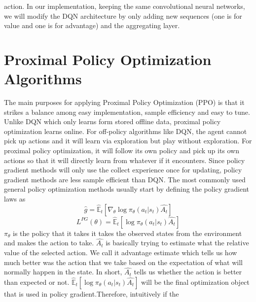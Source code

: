 \documentclass[%
,aps%
 ,twocolumn%
 ,secnumarabic%
,amssymb, amsmath,nobibnotes, aps, prl, floatfix]{revtex4-1}
\begin{document}
action. In our implementation, keeping the same convolutional neural networks, we will modify the DQN architecture by only adding new sequences (one is for value and one is for advantage) and the aggregating layer.

\section{ Proximal Policy Optimization Algorithms}
The main purposes for applying Proximal Policy Optimization (PPO) is that it strikes a balance among easy implementation, sample efficiency and easy to tune. Unlike DQN which only learns form stored offline data, proximal policy optimization learns online. For off-policy algorithms like DQN, the agent cannot pick up actions and it will learn via exploration but play without exploration. For proximal policy optimization, it will follow its own policy and pick up its own actions so that it will directly learn from whatever if it encounters. Since policy gradient methods will only use the collect experience once for updating, policy gradient methods are less sample efficient than DQN. The most commonly used general policy optimization methods usually start by defining the policy gradient laws as $$\hat{g} = \hat{\mathbb{E}}_{t}[\nabla_{\theta}\log\pi_{\theta}(a_{t}|s_{t})\hat{A_t}] $$ 
$$L^{PG}(\theta) = \hat{\mathbb{E}}_{t}[\log\pi_{\theta}(a_{t}|s_{t})\hat{A_t}] $$ $\pi_{\theta}$ is the policy that it takes it takes the observed states from the environment and makes the action to take. $\hat{A_t}$ is basically trying to estimate what the relative value of the selected action. We call it advantage estimate which tells us how much better was the action that we take based on the expectation of what will normally happen in the state. In short, $\hat{A_t}$ tells us whether the action is better than expected or not. $\hat{\mathbb{E}}_{t}[\log\pi_{\theta}(a_{t}|s_{t})\hat{A_t}]$ will be the final optimization object that is used in policy gradient.Therefore, intuitively if the 
\end{document}
